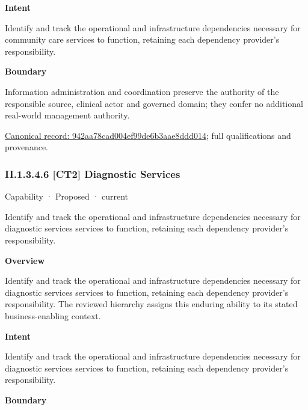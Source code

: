 \textbf{Intent}



Identify and track the operational and infrastructure dependencies necessary for community care services to function, retaining each dependency provider's responsibility.



\textbf{Boundary}



Information administration and coordination preserve the authority of the responsible source, clinical actor and governed domain; they confer no additional real-world management authority.


{\footnotesize \href{../../../../continuum/strategy/capability/942aa78cad004ef99de6b3aae8ddd014.md}{Canonical record: 942aa78cad004ef99de6b3aae8ddd014}; full qualifications and provenance.}\par
\subsubsection*{II.1.3.4.6 [CT2] Diagnostic Services}
\label{navigation:II.1.3.4.6}

\label{element:b825ebab42f444d8b738b4c1f489f785}
{\small Capability · Proposed · current}\par

Identify and track the operational and infrastructure dependencies necessary for diagnostic services services to function, retaining each dependency provider's responsibility.



\textbf{Overview}



Identify and track the operational and infrastructure dependencies necessary for diagnostic services services to function, retaining each dependency provider's responsibility. The reviewed hierarchy assigns this enduring ability to its stated business-enabling context.



\textbf{Intent}



Identify and track the operational and infrastructure dependencies necessary for diagnostic services services to function, retaining each dependency provider's responsibility.



\textbf{Boundary}



